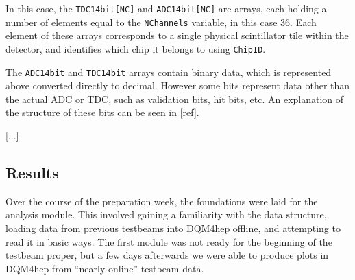 %
%

In this case, the \texttt{TDC14bit[NC]} and \texttt{ADC14bit[NC]} are arrays, each holding a number of elements equal to the \texttt{NChannels} variable, in this case 36. Each element of these arrays corresponds to a single physical scintillator tile within the detector, and identifies which chip it belongs to using \texttt{ChipID}. 

The \texttt{ADC14bit} and \texttt{TDC14bit} arrays contain binary data, which is represented above converted directly to decimal. However some bits represent data other than the actual ADC or TDC, such as validation bits, hit bits, etc. An explanation of the structure of these bits can be seen in [ref].

[...] %

\subsection{Results}
Over the course of the preparation week, the foundations were laid for the analysis module. This involved gaining a familiarity with the data structure, loading data from previous testbeams into DQM4hep offline, and attempting to read it in basic ways. The first module was not ready for the beginning of the testbeam proper, but a few days afterwards we were able to produce plots in DQM4hep from ``nearly-online'' testbeam data.

